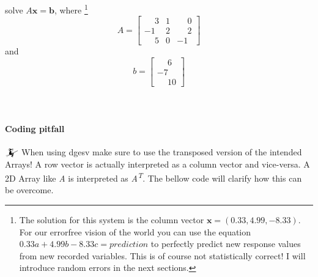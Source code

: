 \documentclass {article}
\begin{document}
solve $A\textbf{x}=\textbf{b}$, where \footnote{The solution for this system is the column vector $\textbf{x}=(0.33, 4.99, -8.33)$. For our errorfree vision of the world you can use the equation $0.33a+4.99b-8.33c=prediction$ to perfectly predict new response values from new recorded variables. This is of course not statistically correct! I will introduce random errors in the next sections.}\\
\begin{equation*}
A = 
\left[
\begin{matrix}
\phantom{-} 3 & 1 & \phantom{-}0 \\
-1 & 2 & \phantom{-}2 \\
\phantom{-} 5 & 0 & -1
\end{matrix}
\right]
\end{equation*} 
and 
\begin{equation*}
b=
\left[
\begin{matrix}
\phantom{-} 6\\
-7\\
\phantom{-}10
\end{matrix}
\right]
\end{equation*}
\\
\\
\paragraph{Coding pitfall} $\mathwitch$  When using dgesv make sure to use the transposed version of the intended Arrays! A row vector is actually interpreted as a column vector and vice-versa. A 2D Array like \textit{A} is interpreted as \textit{A\textsuperscript{T}}. The bellow code will clarify how this can be overcome.     
\end{document}
